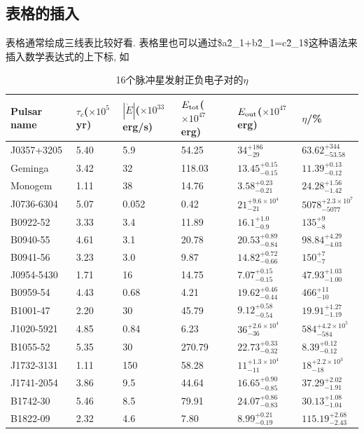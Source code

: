 \documentclass[a4paper]{article}
\begin{document}
\begin{spacing}{1.5}
\subsection{表格的插入}
\label{sec:Tables}
表格通常绘成三线表比较好看. 表格里也可以通过\$a\^2\_1+b\^2\_1=c\^2\_1\$这种语法来插入数学表达式的上下标, 如
\begin{table}[ht]
\centering
\caption{16个脉冲星发射正负电子对的$\eta$}
\begin{tabular}{llllll}
\toprule
Pulsar name&$\tau_c$($\times10^5$ yr)&$|\dot{E}|$($\times10^{33}$ erg/s)&$E_{\rm tot}$($\times10^{47}$ erg)&$E_{\rm out}$($\times10^{47}$ erg)&$\eta$/\%\\
\midrule
J0357+3205&5.40&5.9&54.25&$34^{+186}_{-29}$&$63.62^{+344}_{-53.58}$\\ %
Geminga   &3.42&32&118.03&$13.45^{+0.15}_{-0.15}$&$11.39^{+0.13}_{-0.12}$\\ %
Monogem   &1.11&38&14.76&$3.58^{+0.23}_{-0.21}$&$24.28^{+1.56}_{-1.42}$\\ %
J0736-6304&5.07&0.052&0.42&$21^{+9.6\times10^4}_{-21}$&$5078^{+2.3\times10^7}_{-5077}$\\ %
B0922-52  &3.33&3.4&11.89&$16.1^{+1.0}_{-0.9}$&$135^{+9}_{-8}$\\ %
B0940-55  &4.61&3.1&20.78&$20.53^{+0.89}_{-0.84}$&$98.84^{+4.29}_{-4.03}$\\ %
B0941-56  &3.23&3.0&9.87&$14.82^{+0.72}_{-0.66}$&$150^{+7}_{-7}$\\ %
J0954-5430&1.71&16&14.75&$7.07^{+0.15}_{-0.15}$&$47.93^{+1.03}_{-1.00}$\\ %
B0959-54  &4.43&0.68&4.21&$19.62^{+0.46}_{-0.44}$&$466^{+11}_{-10}$\\ %
B1001-47  &2.20&30&45.79&$9.12^{+0.58}_{-0.54}$&$19.91^{+1.27}_{-1.19}$\\ %
J1020-5921&4.85&0.84&6.23&$36^{+2.6\times10^4}_{-36}$&$584^{+4.2\times10^5}_{-584}$\\ %
B1055-52  &5.35&30&270.79&$22.73^{+0.33}_{-0.32}$&$8.39^{+0.12}_{-0.12}$\\ %
J1732-3131&1.11&150&58.28&$11^{+1.3\times10^4}_{-11}$&$18^{+2.2\times10^3}_{-18}$\\ %
J1741-2054&3.86&9.5&44.64&$16.65^{+0.90}_{-0.85}$&$37.29^{+2.02}_{-1.91}$\\ %
B1742-30  &5.46&8.5&79.91&$24.07^{+0.86}_{-0.83}$&$30.13^{+1.08}_{-1.04}$\\ %
B1822-09  &2.32&4.6&7.80&$8.99^{+0.21}_{-0.19}$&$115.19^{+2.68}_{-2.43}$\\ %
\bottomrule
\end{tabular}
\label{tab:pulsar_eta}
\end{table}


\end{spacing}
\end{document}
